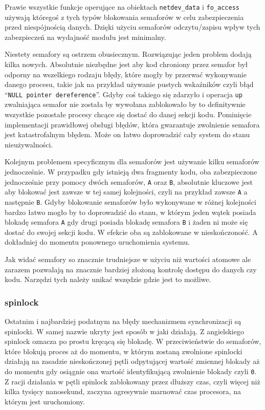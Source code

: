 Prawie wszystkie funkcje operujące na obiektach \texttt{netdev\_data} i
\texttt{fo\_access} używają któregoś z tych typów blokowania semaforów w
celu zabezpieczenia przed niespójnością danych. Dzięki użyciu semaforów
odczytu/zapisu wpływ tych zabezpieczeń na wydajność modułu jest
minimalny.

Niestety semafory są ostrzem obusiecznym. Rozwiązując jeden problem
dodają kilka nowych. Absolutnie niezbędne jest aby kod chroniony przez
semafor był odporny na wszelkiego rodzaju błędy, które mogły by przerwać
wykonywanie danego procesu, takie jak na przykład używanie pustych
wskaźników czyli błąd ``\texttt{NULL pointer dereference}''. Gdyby coś
takiego się zdarzyło i operacja \texttt{up} zwalniająca semafor nie
została by wywołana zablokowało by to definitywnie wszystkie pozostałe
procesy chcące się dostać do danej sekcji kodu. Pominięcie implementacji
prawidłowej obsługi błędów, która gwarantuje zwolnienie semafora jest
katastrofalnym błędem. Może on łatwo doprowadzić cały system do stanu
nieużywalności.

Kolejnym problemem specyficznym dla semaforów jest używanie kilku
semaforów jednocześnie. W przypadku gdy istnieją dwa fragmenty kodu, oba
zabezpieczone jednocześnie przy pomocy dwóch semaforów, \texttt{A} oraz
\texttt{B}, absolutnie kluczowe jest aby blokować jest zawsze w tej
samej kolejności, czyli na przykład zawsze \texttt{A} a następnie
\texttt{B}. Gdyby blokowanie semaforów było wykonywane w różnej
kolejności bardzo łatwo mogło by to doprowadzić do stanu, w którym jeden
wątek posiada blokadę semafora \texttt{A} gdy drugi posiada blokadę
semafora \texttt{B} i żaden ni może się dostać do swojej sekcji kodu. W
efekcie oba są zablokowane w nieskończoność. A dokładniej do momentu
ponownego uruchomienia systemu.

Jak widać semafory so znacznie trudniejsze w użyciu niż wartości atomowe
ale zarazem pozwalają na znacznie bardziej złożoną kontrolę dostępu do
danych czy kodu. Narzędzi tych należy unikać wszędzie gdzie jest to
możliwe.

\subsubsection{spinlock}

Ostatnim i najbardziej podatnym na błędy mechanizmem synchronizacji są
spinlocki. W samej nazwie ukryty jest sposób w jaki działają. Z
angielskiego spinlock oznacza po prostu kręcącą się blokadę. W
przeciwieństwie do semaforów, które blokują proces aż do momentu, w
którym zostaną zwolnione spinlocki działają na zasadzie nieskończonej
pętli odpytującej wartość zmiennej blokady aż do momentu gdy osiągnie
ona wartość identyfikującą zwolnienie blokady czyli \texttt{0}. Z racji
działania w pętli spinlock zablokowany przez dłuższy czas, czyli więcej
niż kilka tysięcy nanosekund, zaczyna agresywnie marnować czas
procesora, na którym jest uruchomiony.

